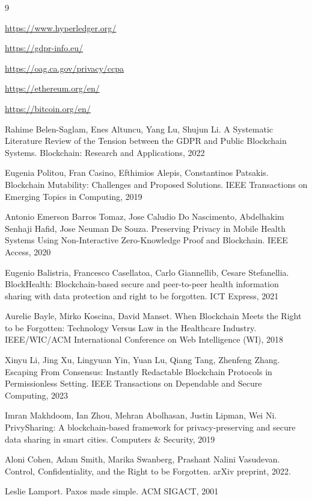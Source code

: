 
\begin{thebibliography}{9}

\url{https://www.hyperledger.org/}

\url{https://gdpr-info.eu/}

\url{https://oag.ca.gov/privacy/ccpa}

\url{https://ethereum.org/en/}

\url{https://bitcoin.org/en/}

 Rahime Belen-Saglam, Enes Altuncu, Yang Lu, Shujun Li. A Systematic Literature Review of the Tension between the GDPR and Public Blockchain Systems. Blockchain: Research and Applications, 2022

Eugenia Politou, Fran Casino, Efthimios Alepis, Constantinos Patsakis. Blockchain Mutability: Challenges and Proposed Solutions. IEEE Transactions on Emerging Topics in Computing, 2019

Antonio Emerson Barros Tomaz, Jose Caludio Do Nascimento, Abdelhakim Senhaji Hafid, Jose Neuman De Souza. Preserving Privacy in Mobile Health Systems Using Non-Interactive Zero-Knowledge Proof and Blockchain. IEEE Access, 2020

Eugenio Balistria, Francesco Casellatoa, Carlo Giannellib, Cesare Stefanellia. BlockHealth: Blockchain-based secure and peer-to-peer health information sharing with data protection and right to be forgotten. ICT Express, 2021

Aurelie Bayle,  Mirko Koscina, David Manset. When Blockchain Meets the Right to be Forgotten: Technology Versus Law in the Healthcare Industry. IEEE/WIC/ACM International Conference on Web Intelligence (WI), 2018

Xinyu Li, Jing Xu, Lingyuan Yin, Yuan Lu, Qiang Tang, Zhenfeng Zhang. Escaping From Consensus: Instantly Redactable Blockchain Protocols in Permissionless Setting. IEEE Transactions on Dependable and Secure Computing, 2023

Imran Makhdoom, Ian Zhou, Mehran Abolhasan, Justin Lipman, Wei Ni. PrivySharing: A blockchain-based framework for privacy-preserving and secure data sharing in smart cities. Computers \& Security, 2019

Aloni Cohen, Adam Smith, Marika Swanberg, Prashant Nalini Vasudevan. Control, Confidentiality,
and the Right to be Forgotten. arXiv preprint, 2022.

Leslie Lamport. Paxos made simple. ACM SIGACT, 2001


\end{thebibliography}
